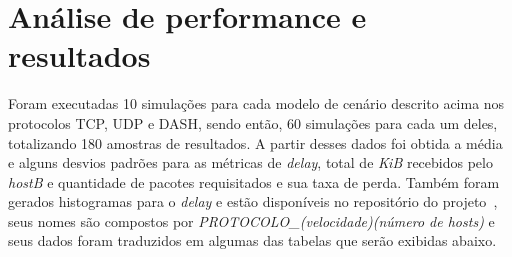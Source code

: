 \documentclass[12pt]{article}
\begin{document}
\section{Análise de performance e resultados} \label{sec:analise}
	Foram executadas 10 simulações para cada modelo de cenário descrito acima nos protocolos TCP, UDP e DASH, sendo então, 60 simulações para cada um deles, totalizando 180 amostras de resultados. A partir desses dados foi obtida a média e alguns desvios padrões para as métricas de \textit{delay}, total de \textit{KiB} recebidos pelo \textit{hostB} e quantidade de pacotes requisitados e sua taxa de perda. Também foram gerados histogramas para o \textit{delay} e estão disponíveis no repositório do projeto~\cite{ic}, seus nomes são compostos por \textit{PROTOCOLO\_(velocidade)(número de \textit{hosts})} e seus dados foram traduzidos em algumas das tabelas que serão exibidas abaixo.
\end{document}
